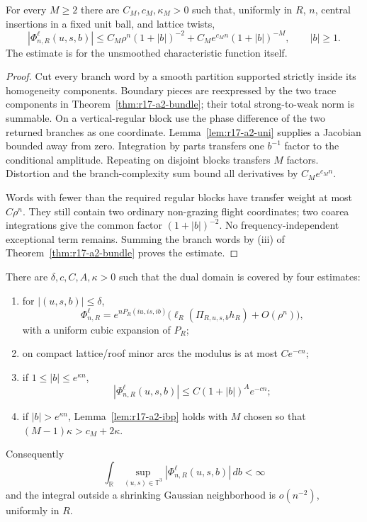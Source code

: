 \begin{lemma}
\label{lem:r17-a2-ibp}
For every \(M\ge2\) there are \(C_M,c_M,\kappa_M>0\) such that, uniformly in
\(R\), \(n\), central insertions in a fixed unit ball, and lattice twists,
\[
 |\Phi_{n,R}^{\ell}(u,s,b)|
 \le C_M\rho^n(1+|b|)^{-2}
      +C_Me^{c_Mn}(1+|b|)^{-M},
 \qquad |b|\ge1.
\]
The estimate is for the unsmoothed characteristic function itself.
\end{lemma}

\begin{proof}
Cut every branch word by a smooth partition supported strictly inside its
homogeneity components.  Boundary pieces are reexpressed by the two trace
components in Theorem~\ref{thm:r17-a2-bundle}; their total strong-to-weak norm
is summable.  On a vertical-regular block use the phase difference of the two
returned branches as one coordinate.  Lemma~\ref{lem:r17-a2-uni} supplies a
Jacobian bounded away from zero.  Integration by parts transfers one
\(b^{-1}\) factor to the conditional amplitude.  Repeating on disjoint blocks
transfers \(M\) factors.  Distortion and the branch-complexity sum bound all
derivatives by \(C_Me^{c_Mn}\).

Words with fewer than the required regular blocks have transfer weight at
most \(C\rho^n\).  They still contain two ordinary non-grazing flight
coordinates; two coarea integrations give the common factor
\((1+|b|)^{-2}\).  No frequency-independent exceptional term remains.
Summing the branch words by (iii) of
Theorem~\ref{thm:r17-a2-bundle} proves the estimate.
\end{proof}

\begin{theorem}
\label{thm:r17-a2-fourier}
There are \(\delta,c,C,A,\kappa>0\) such that the dual domain is covered by
four estimates:
\begin{enumerate}[label=(\alph*)]
\item for \(|(u,s,b)|\le\delta\),
\[
 \Phi_{n,R}^{\ell}
 =e^{nP_R(iu,is,ib)}
  \bigl(\ell_R(\Pi_{R,u,s,b}h_R)+O(\rho^n)\bigr),
\]
with a uniform cubic expansion of \(P_R\);
\item on compact lattice/roof minor arcs the modulus is at most \(Ce^{-cn}\);
\item if \(1\le|b|\le e^{\kappa n}\),
\[
 |\Phi_{n,R}^{\ell}(u,s,b)|
 \le C(1+|b|)^Ae^{-cn};
\]
\item if \(|b|>e^{\kappa n}\), Lemma~\ref{lem:r17-a2-ibp} holds with
      \(M\) chosen so that \((M-1)\kappa>c_M+2\kappa\).
\end{enumerate}
Consequently
\[
 \int_{\mathbb R}
 \sup_{(u,s)\in\mathbb T^3}
 |\Phi_{n,R}^{\ell}(u,s,b)|\,db<\infty
\]
and the integral outside a shrinking Gaussian neighborhood is
\(o(n^{-2})\), uniformly in \(R\).
\end{theorem}

